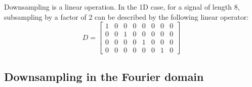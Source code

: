Downsampling is a linear operation. In the 1D case, for a signal of length 8, subsampling by a factor of 2 can be described by the following linear operator:
\begin{equation}
  D = \left[
    \begin{array}{cccccccc}
      1 & 0 & 0 & 0 & 0 & 0 & 0 & 0 \\
      0 & 0 & 1 & 0 & 0 & 0 & 0 & 0 \\
      0 & 0 & 0 & 0 & 1 & 0 & 0 & 0 \\
      0 & 0 & 0 & 0 & 0 & 0 & 1 & 0
    \end{array}
    \right]
\end{equation}



\subsection{Downsampling in the Fourier domain}

